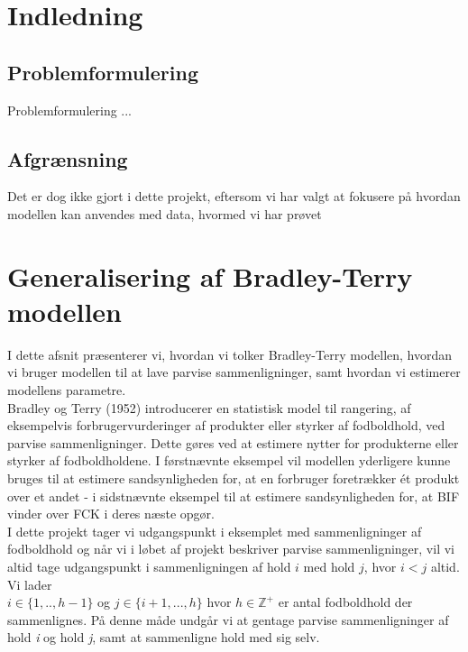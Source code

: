 \documentclass[11pt,a4paper]{article}
\begin{document}
\section{Indledning}

\subsection{Problemformulering}
Problemformulering ...
\subsection{Afgrænsning}
Det er dog ikke gjort i dette projekt, eftersom vi har valgt at fokusere på hvordan modellen kan anvendes med data, hvormed vi har prøvet
\section{Generalisering af Bradley-Terry modellen}
I dette afsnit præsenterer vi, hvordan vi tolker Bradley-Terry modellen, hvordan vi bruger modellen til at lave parvise sammenligninger, samt hvordan vi estimerer modellens parametre.\\ \newline
Bradley og Terry (1952)\cite{BradleyTerry} introducerer en statistisk model til rangering, af eksempelvis forbrugervurderinger af produkter eller styrker af fodboldhold, ved parvise sammenligninger. Dette gøres ved at estimere nytter for produkterne eller styrker af fodboldholdene. I førstnævnte eksempel vil modellen yderligere kunne bruges til at estimere sandsynligheden for, at en forbruger foretrækker ét produkt over et andet - i sidstnævnte eksempel til at estimere sandsynligheden for, at BIF vinder over FCK i deres næste opgør.\\ I dette projekt tager vi udgangspunkt i eksemplet med sammenligninger af fodboldhold og når vi i løbet af projekt beskriver parvise sammenligninger, vil vi altid tage udgangspunkt i sammenligningen af hold $i$ med hold $j$, hvor $i<j$ altid. Vi lader \\$i \in \{1,..,h-1\}$ og $j\in \{i+1,...,h\}$ hvor $h\in \mathbb{Z}^+$ er antal fodboldhold der sammenlignes. På denne måde undgår vi at gentage parvise sammenligninger af hold \textit{i} og hold \textit{j}, samt at sammenligne hold med sig selv. 
\end{document}
